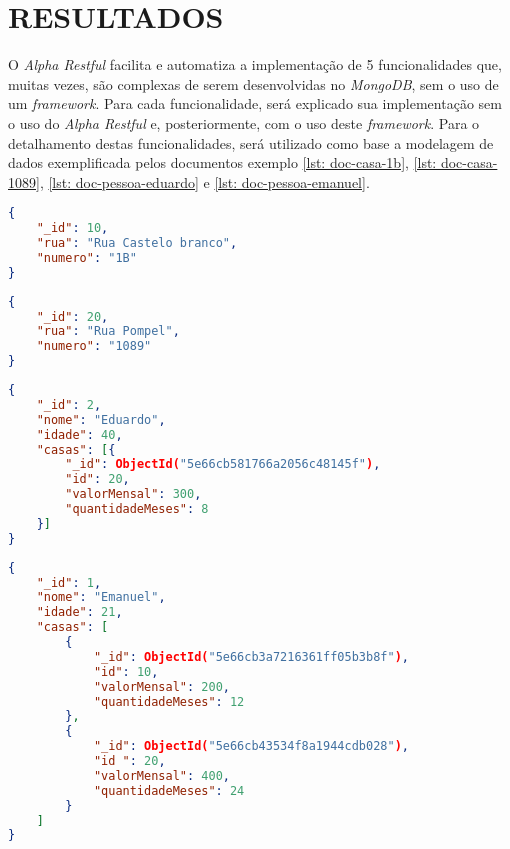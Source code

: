 \chapter{RESULTADOS}
\label{Resultados}

O \textit{Alpha Restful} facilita e automatiza a implementação de 5 funcionalidades que,
muitas vezes,
são complexas de serem desenvolvidas no \textit{MongoDB}, sem o uso de um \textit{framework}. Para cada funcionalidade, será explicado sua implementação sem o uso do \textit{Alpha Restful} e, posteriormente, com o uso deste \textit{framework}. Para o detalhamento destas funcionalidades, será utilizado como base a modelagem de dados exemplificada pelos documentos exemplo \ref{lst: doc-casa-1b}, \ref{lst: doc-casa-1089}, \ref{lst: doc-pessoa-eduardo} e \ref{lst: doc-pessoa-emanuel}.

\begin{lstlisting}[language=json, caption={Documento da Casa de Número 1B\label{lst: doc-casa-1b}}]
{
    "_id": 10,
    "rua": "Rua Castelo branco",
    "numero": "1B"
}
\end{lstlisting}


\begin{lstlisting}[language=json, caption={Documento da Casa de Número 1089\label{lst: doc-casa-1089}}]
{
    "_id": 20,
    "rua": "Rua Pompel",
    "numero": "1089"
}
\end{lstlisting}


\begin{lstlisting}[language=json, caption={Documento da Pessoa \textit{Eduardo}\label{lst: doc-pessoa-eduardo}}]
{
    "_id": 2,
    "nome": "Eduardo",
    "idade": 40,
    "casas": [{
        "_id": ObjectId("5e66cb581766a2056c48145f"),
        "id": 20,
        "valorMensal": 300,
        "quantidadeMeses": 8
    }]
}
\end{lstlisting}

\newpage

\begin{lstlisting}[language=json, caption={Documento da Pessoa \textit{Emanuel}\label{lst: doc-pessoa-emanuel}}]
{
    "_id": 1,
    "nome": "Emanuel",
    "idade": 21,
    "casas": [
        {
            "_id": ObjectId("5e66cb3a7216361ff05b3b8f"),
            "id": 10,
            "valorMensal": 200,
            "quantidadeMeses": 12
        },
        {
            "_id": ObjectId("5e66cb43534f8a1944cdb028"),
            "id ": 20,
            "valorMensal": 400,
            "quantidadeMeses": 24
        }
    ]
}
\end{lstlisting}


